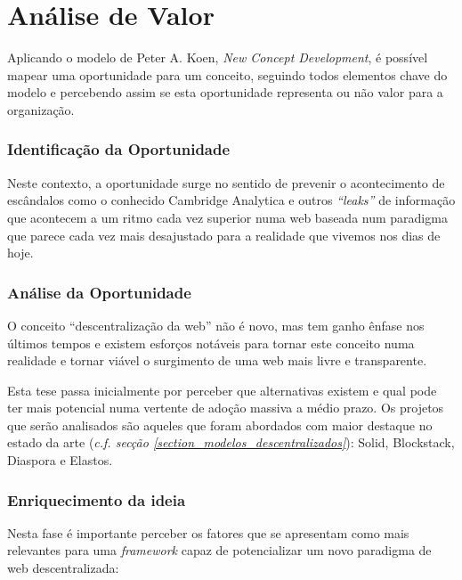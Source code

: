 \chapter{Análise de Valor}
\label{cap:3}

Aplicando o modelo de Peter A. Koen, \emph{New Concept Development}, é possível mapear uma oportunidade para um conceito, seguindo todos elementos chave do modelo e percebendo assim
se esta oportunidade representa ou não valor para a organização.

\subsection{Identificação da Oportunidade}
Neste contexto, a oportunidade surge no sentido de prevenir o acontecimento de escândalos como o conhecido Cambridge Analytica e outros \emph{“leaks”} \cite{cambridge_analytica} de informação que acontecem a um ritmo cada vez superior numa web baseada num paradigma que parece cada vez mais desajustado para a realidade que vivemos nos dias de hoje.

\subsection{Análise da Oportunidade}
O conceito “descentralização da web” não é novo, mas tem ganho ênfase nos últimos tempos e existem esforços notáveis para tornar este conceito numa realidade e tornar viável o surgimento de uma web mais livre e transparente.

Esta tese passa inicialmente por perceber que alternativas existem e qual pode ter mais potencial numa vertente de adoção massiva a médio prazo. Os projetos que serão analisados são aqueles que foram abordados com maior destaque no estado da arte (\emph{c.f. secção \ref{section_modelos_descentralizados}}): Solid, Blockstack, Diaspora e Elastos.

\subsection{Enriquecimento da ideia}
Nesta fase é importante perceber os fatores que se apresentam como mais relevantes para uma \emph{framework} capaz de potencializar um novo paradigma de web descentralizada:

